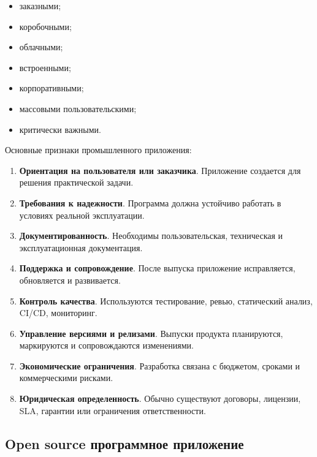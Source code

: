 \documentclass[12pt,a4paper]{article}
\begin{document}
\begin{itemize}
    \item заказными;
    \item коробочными;
    \item облачными;
    \item встроенными;
    \item корпоративными;
    \item массовыми пользовательскими;
    \item критически важными.
\end{itemize}

Основные признаки промышленного приложения:

\begin{enumerate}
    \item \textbf{Ориентация на пользователя или заказчика}. Приложение создается для решения практической задачи.

    \item \textbf{Требования к надежности}. Программа должна устойчиво работать в условиях реальной эксплуатации.

    \item \textbf{Документированность}. Необходимы пользовательская, техническая и эксплуатационная документация.

    \item \textbf{Поддержка и сопровождение}. После выпуска приложение исправляется, обновляется и развивается.

    \item \textbf{Контроль качества}. Используются тестирование, ревью, статический анализ, CI/CD, мониторинг.

    \item \textbf{Управление версиями и релизами}. Выпуски продукта планируются, маркируются и сопровождаются изменениями.

    \item \textbf{Экономические ограничения}. Разработка связана с бюджетом, сроками и коммерческими рисками.

    \item \textbf{Юридическая определенность}. Обычно существуют договоры, лицензии, SLA, гарантии или ограничения ответственности.
\end{enumerate}

\subsection{Open source программное приложение}
\end{document}
